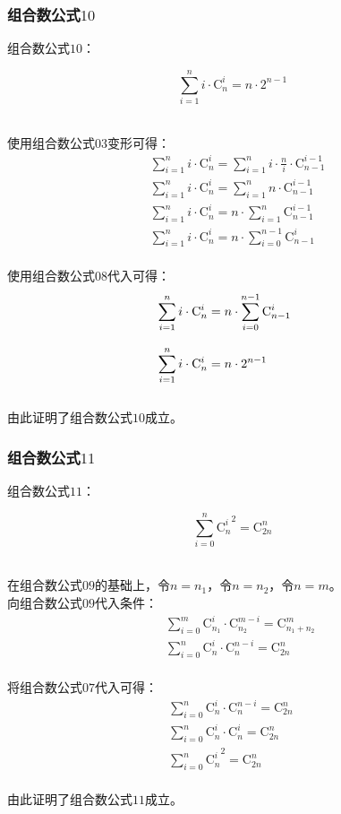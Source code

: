 \documentclass[UTF8]{ctexart}
\newcommand{\Co}{\mathrm{C}}
\begin{document}
\subsubsection{组合数公式$10$}
    组合数公式$10$：
    \begin{large}
        \begin{equation*}
            \sum_{i=1}^{n}i\cdot\Co_n^i=n\cdot 2^{n-1}
        \end{equation*}
    \end{large}\\
    使用组合数公式$03$变形可得：
    \setcounter{equation}{0}
    \begin{align}
        &\sum_{i=1}^{n}i\cdot\Co_n^i=\sum_{i=1}^{n}i\cdot\frac{n}{i}\cdot\Co_{n-1}^{i-1}\\[3mm]
        &\sum_{i=1}^{n}i\cdot\Co_n^i=\sum_{i=1}^{n}n\cdot\Co_{n-1}^{i-1}\\[3mm]
        &\sum_{i=1}^{n}i\cdot\Co_n^i=n\cdot\sum_{i=1}^{n}\Co_{n-1}^{i-1}\\[3mm]
        &\sum_{i=1}^{n}i\cdot\Co_n^i=n\cdot\sum_{i=0}^{n-1}\Co_{n-1}^{i}
    \end{align}\\
    使用组合数公式$08$代入可得：
    \begin{align}
        &\sum_{i=1}^{n}i\cdot\Co_n^i=n\cdot\sum_{i=0}^{n-1}\Co_{n-1}^{i}~~~~\hspace{0.5pt}\\[3mm]
        &\sum_{i=1}^{n}i\cdot\Co_n^i=n\cdot 2^{n-1}
    \end{align}\\
    由此证明了组合数公式$10$成立。

\newpage

\subsubsection{组合数公式$11$}
    组合数公式$11$：
    \begin{large}
        \begin{equation*}
            \sum_{i=0}^{n}{\Co_n^i}^2=\Co_{2n}^{n}
        \end{equation*}
    \end{large}\\
    在组合数公式$09$的基础上，令$n=n_1$，令$n=n_2$，令$n=m$。\\[3mm]
    向组合数公式$09$代入条件：\vspace{5pt}
    \setcounter{equation}{0}
    \begin{align}
        &~~\sum_{i=0}^m\Co_{n_1}^i\cdot\Co_{n_2}^{m-i}=\Co_{n_1+n_2}^m\\[3mm]
        &~~\sum_{i=0}^n\Co_{n}^i\cdot\Co_{n}^{n-i}=\Co_{2n}^n
    \end{align}\\
    将组合数公式$07$代入可得：
    \begin{align}
        &\sum_{i=0}^n\Co_{n}^i\cdot\Co_{n}^{n-i}=\Co_{2n}^n~~~~~\\[3mm]
        &\sum_{i=0}^n\Co_{n}^i\cdot\Co_{n}^{i}=\Co_{2n}^n\\[3mm]
        &\sum_{i=0}^{n}{\Co_n^i}^2=\Co_{2n}^{n}
    \end{align}\\
    由此证明了组合数公式$11$成立。
\end{document}

